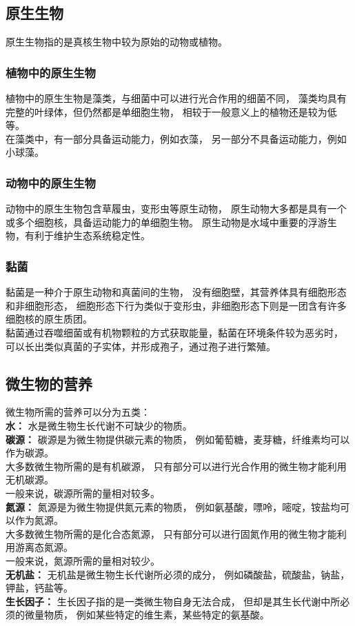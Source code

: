\documentclass[UTF8]{ctexart}
\begin{document}
\newpage

\subsection{原生生物}
    原生生物指的是真核生物中较为原始的动物或植物。

\subsubsection{植物中的原生生物}
    植物中的原生生物是藻类，与细菌中可以进行光合作用的细菌不同，
    藻类均具有完整的叶绿体，但仍然都是单细胞生物，
    相较于一般意义上的植物还是较为低等。\\[3mm]
    在藻类中，有一部分具备运动能力，例如衣藻，
    另一部分不具备运动能力，例如小球藻。

\subsubsection{动物中的原生生物}
    动物中的原生生物包含草履虫，变形虫等原生动物，
    原生动物大多都是具有一个或多个细胞核，具备运动能力的单细胞生物。
    原生动物是水域中重要的浮游生物，有利于维护生态系统稳定性。

\subsubsection{黏菌}
    黏菌是一种介于原生动物和真菌间的生物，
    没有细胞壁，其营养体具有细胞形态和非细胞形态，
    细胞形态下行为类似于变形虫，非细胞形态下则是一团含有许多细胞核的原生质团。\\[3mm]
    黏菌通过吞噬细菌或有机物颗粒的方式获取能量，黏菌在环境条件较为恶劣时，
    可以长出类似真菌的子实体，并形成孢子，通过孢子进行繁殖。

\subsection{微生物的营养}
    微生物所需的营养可以分为五类：\\[5mm]
    \textbf{水：}
    水是微生物生长代谢不可缺少的物质。\\[6mm]
    \textbf{碳源：}
    碳源是为微生物提供碳元素的物质，
    例如葡萄糖，麦芽糖，纤维素均可以作为碳源。\\[3mm]
    大多数微生物所需的是有机碳源，
    只有部分可以进行光合作用的微生物才能利用无机碳源。\\[3mm]
    一般来说，碳源所需的量相对较多。\\[6mm]
    \textbf{氮源：}
    氮源是为微生物提供氮元素的物质，
    例如氨基酸，嘌呤，嘧啶，铵盐均可以作为氮源。\\[3mm]
    大多数微生物所需的是化合态氮源，
    只有部分可以进行固氮作用的微生物才能利用游离态氮源。\\[3mm]
    一般来说，氮源所需的量相对较少。\\[6mm]
    \textbf{无机盐：}
    无机盐是微生物生长代谢所必须的成分，
    例如磷酸盐，硫酸盐，钠盐，钾盐，钙盐等。\\[6mm]
    \textbf{生长因子：}
    生长因子指的是一类微生物自身无法合成，
    但却是其生长代谢中所必须的微量物质，
    例如某些特定的维生素，某些特定的氨基酸。
\end{document}
